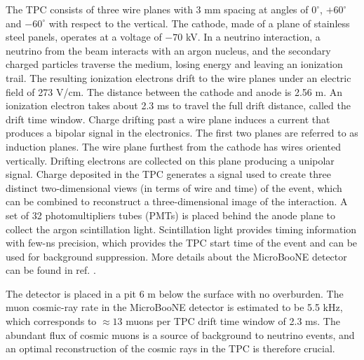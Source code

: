 \documentclass[a4paper,11pt]{article}
\begin{document}
The TPC consists of three wire planes with 3 mm spacing at angles of $0^{\circ}$,  $+60^{\circ}$ and  $-60^{\circ}$ with respect to the vertical. The cathode, made of a plane of stainless steel panels, operates at a voltage of $-70$ kV. In a neutrino interaction, a neutrino from the beam interacts with an argon nucleus, and the secondary charged particles traverse the medium, losing energy and leaving an ionization trail. The resulting ionization electrons drift to the wire planes under an electric field of 273 V/cm. The distance between the cathode and anode is 2.56 m. An ionization electron takes about 2.3 ms to travel the full drift distance, called the drift time window. Charge drifting past a wire plane induces a current that produces a bipolar signal in the electronics. The first two planes are referred to as induction planes. The wire plane furthest from the cathode has wires oriented vertically. Drifting electrons are collected on this plane producing a unipolar signal. Charge deposited in the TPC generates a signal used to create three distinct two-dimensional views (in terms of wire and time) of the event, which can be combined to reconstruct a three-dimensional image of the interaction.
A set of 32 photomultipliers tubes (PMTs) is placed behind the anode plane to collect the argon scintillation light. Scintillation light provides timing information with few-ns precision, which provides the TPC start time of the event and can be used for background suppression. More details about the MicroBooNE detector can be found in ref. \cite{detector}.

The detector is placed in a pit 6 m below the surface with no overburden. The muon cosmic-ray rate in the MicroBooNE detector is estimated to be 5.5 kHz, which corresponds to $\approx13$ muons per TPC drift time window of 2.3 ms. The abundant flux of cosmic muons is a source of background to neutrino events, and an optimal reconstruction of the cosmic rays in the TPC is therefore crucial.
\end{document}
